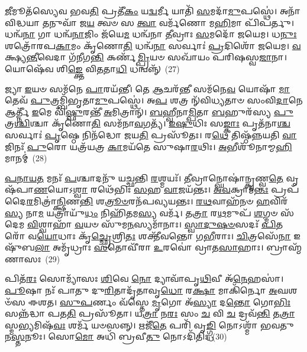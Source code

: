 {\anuvakamend[{\-\ul{𑌅}\-\-\ul{𑌗𑌾}\-𑍞 \ul{𑌸}\-\-\ul{𑌹}\-\-\ul{𑌸𑍍𑌰𑌾}\-\-\ul{𑌕𑍍𑌷} \ul{𑌦𑍇}\-\-\ul{𑌵𑌾𑌃} \ul{𑌸}\-𑌹𑌸𑍍𑌰᳴𑌧𑌾\-\ul{𑌰𑌾}\-𑌮𑌤𑍍𑌯𑍞᳴\-\ul{𑌹𑌾} 𑌅𑌨𑍁᳴𑌵𑌰𑍍𑌤𑍍𑌮𑌾\-\ul{𑌨𑌃} 𑌷𑍋𑌡᳴𑌶 𑌚}]}%

\-\ul{𑌜𑍀}\-𑌮𑍂𑌤᳴𑌸𑍍𑌯𑍇𑌵 𑌭𑌵\-\ul{𑌤𑌿} 𑌪𑍍𑌰𑌤𑍀᳴\-\ul{𑌕𑌂} 𑌯\-\ul{𑌦𑍍𑌵}\-𑌰𑍍𑌮𑍀 𑌯𑌾𑌤𑌿᳴ \ul{𑌸}\-𑌮𑌦𑌾᳴\-\ul{𑌮𑍁}\-𑌪𑌸𑍍𑌥𑍇॑। 𑌅𑌨𑌾᳴𑌵𑌿𑌦𑍍𑌧𑌯𑌾 \ul{𑌤}\-𑌨𑍁𑌵𑌾᳴ 𑌜\-\ul{𑌯} 𑌤𑍍𑌵𑍞 𑌸 \ul{𑌤𑍍𑌵𑌾} 𑌵𑌰𑍍𑌮᳴𑌣𑍋 𑌮\-\ul{𑌹𑌿}\-𑌮𑌾 𑌪𑌿᳴𑌪𑌰𑍍𑌤𑍁। 𑌧𑌨𑍍𑌵᳴\-\ul{𑌨𑌾} 𑌗𑌾 𑌧𑌨𑍍𑌵᳴\-\ul{𑌨𑌾}\-𑌜𑌿𑌂 𑌜᳴𑌯𑍇\-\ul{𑌮} 𑌧𑌨𑍍𑌵᳴𑌨𑌾 \ul{𑌤𑍀}\-𑌵𑍍𑌰𑌾𑌃 \ul{𑌸}\-𑌮𑌦𑍋᳴ 𑌜𑌯𑍇𑌮। 𑌧\-\ul{𑌨𑍁𑌃} 𑌶𑌤𑍍𑌰𑍋᳴𑌰𑌪\-\ul{𑌕𑌾}\-𑌮𑌂 𑌕𑍃᳴𑌣𑍋\-\ul{𑌤𑌿} 𑌧𑌨𑍍𑌵᳴\-\ul{𑌨𑌾} 𑌸𑌰𑍍𑌵𑌾𑌃॑ \ul{𑌪𑍍𑌰}\-𑌦𑌿𑌶𑍋᳴ 𑌜𑌯𑍇𑌮। \ul{𑌵}\-𑌕𑍍𑌷𑍍𑌯\-\ul{𑌨𑍍𑌤𑍀}\-𑌵𑍇𑌦𑌾 𑌗᳴𑌨𑍀𑌗\-\ul{𑌨𑍍𑌤𑌿} 𑌕𑌰𑍍𑌣᳴\-\ul{𑌮𑍍𑌪𑍍𑌰𑌿}\-𑌯𑍞 𑌸𑌖𑌾᳴𑌯𑌂 𑌪𑌰𑌿𑌷𑌸𑍍𑌵\-\ul{𑌜𑌾}\-𑌨𑌾। 𑌯𑍋𑌷𑍇᳴𑌵 𑌶𑌿\-\ul{𑌙𑍍𑌕𑍍𑌤𑍇} 𑌵𑌿\-\ul{𑌤}\-𑌤𑌾\-\ul{𑌧𑌿} 𑌧𑌨𑍍𑌵𑌨𑍍𑌨𑍍᳴~(27)

𑌜𑍍𑌯𑌾 \ul{𑌇}\-𑌯𑍞 𑌸𑌮᳴𑌨𑍇 \ul{𑌪𑌾}\-𑌰𑌯᳴𑌨𑍍𑌤𑍀। 𑌤𑍇 \ul{𑌆}\-𑌚𑌰᳴\-\ul{𑌨𑍍𑌤𑍀} 𑌸𑌮᳴𑌨𑍇\-\ul{𑌵} 𑌯𑍋𑌷𑌾᳴ \ul{𑌮𑌾}\-𑌤𑍇𑌵᳴ \ul{𑌪𑍁}\-𑌤𑍍𑌰𑌮𑍍𑌬𑌿᳴𑌭𑍃𑌤𑌾\-\ul{𑌮𑍁}\-𑌪𑌸𑍍𑌥𑍇॑। 𑌅\-\ul{𑌪} 𑌶𑌤𑍍𑌰 𑌨𑍍᳴𑌵𑌿𑌧𑍍𑌯𑌤𑌾𑍞 𑌸𑌂𑌵𑌿\-\ul{𑌦𑌾}\-𑌨𑍇 𑌆𑌰𑍍𑌤𑍍𑌨𑍀᳴ \ul{𑌇}\-𑌮𑍇 𑌵𑌿᳴\-\ul{𑌷𑍍𑌫𑍁}\-𑌰𑌨𑍍𑌤𑍀᳴ \ul{𑌅}\-𑌮𑌿𑌤𑍍𑌰𑌾𑌨𑍍᳴। \ul{𑌬}\-\-\ul{𑌹𑍍𑌵𑍀}\-𑌨𑌾\-\ul{𑌮𑍍𑌪𑌿}\-𑌤𑌾 \ul{𑌬}\-𑌹𑍁𑌰᳴𑌸𑍍𑌯 \ul{𑌪𑍁}\-𑌤𑍍𑌰\-\ul{𑌶𑍍𑌚𑌿}\-𑌶𑍍𑌚𑌾 𑌕𑍃᳴𑌣𑍋\-\ul{𑌤𑌿} 𑌸𑌮᳴𑌨𑌾\-\ul{𑌵}\-𑌗𑌤𑍍𑌯᳴। \ul{𑌇}\-\-\ul{𑌷𑍁}\-𑌧𑌿𑌃 𑌸\-\ul{𑌙𑍍𑌕𑌾𑌃} 𑌪𑍃𑌤᳴𑌨𑌾\-\ul{𑌶𑍍𑌚} 𑌸𑌰𑍍𑌵𑌾𑌃॑ \ul{𑌪𑍃}\-𑌷𑍍𑌠𑍇 𑌨𑌿𑌨᳴𑌦𑍍𑌧𑍋 𑌜𑌯\-\ul{𑌤𑌿} 𑌪𑍍𑌰𑌸𑍂᳴𑌤𑌃। 𑌰\-\ul{𑌥𑍇} 𑌤𑌿𑌷𑍍𑌠᳴𑌨𑍍𑌨𑌯𑌤𑌿 \ul{𑌵𑌾}\-𑌜𑌿𑌨𑌃᳴ \ul{𑌪𑍁}\-𑌰𑍋 𑌯𑌤𑍍𑌰᳴𑌯𑌤𑍍𑌰 \ul{𑌕𑌾}\-𑌮𑌯᳴𑌤𑍇 𑌸𑍁𑌷𑌾\-\ul{𑌰}\-𑌥𑌿𑌃। \ul{𑌅}\-𑌭𑍀𑌶𑍂᳴𑌨𑌾𑌮𑍍𑌮\-\ul{𑌹𑌿}\-𑌮𑌾𑌨𑌮𑍍॑~(28)

\-\ul{𑌪}\-\-\ul{𑌨𑌾}\-\-\ul{𑌯}\-\-\ul{𑌤} 𑌮𑌨𑌃᳴ \ul{𑌪}\-𑌶𑍍𑌚𑌾𑌦𑌨𑍁᳴ 𑌯𑌚𑍍𑌛𑌨𑍍𑌤𑌿 \ul{𑌰}\-𑌶𑍍𑌮𑌯𑌃᳴। \ul{𑌤𑍀}\-𑌵𑍍𑌰𑌾𑌨𑍍𑌘𑍋𑌷𑌾॑𑌨𑍍𑌕𑍃𑌣𑍍𑌵\-\ul{𑌤𑍇} 𑌵𑍃𑌷᳴𑌪𑌾\-\ul{𑌣}\-𑌯𑍋\-𑌽\-\ul{𑌶𑍍𑌵𑌾} 𑌰𑌥𑍇᳴𑌭𑌿𑌃 \ul{𑌸}\-𑌹 \ul{𑌵𑌾}\-𑌜𑌯᳴𑌨𑍍𑌤𑌃। \ul{𑌅}\-\-\ul{𑌵}\-𑌕𑍍𑌰𑌾𑌮᳴\-\ul{𑌨𑍍𑌤𑌃} 𑌪𑍍𑌰𑌪᳴𑌦𑍈\-\ul{𑌰}\-𑌮𑌿𑌤𑍍𑌰𑌾॑\-\ul{𑌨𑍍𑌕𑍍𑌷𑌿}\-𑌣\-\ul{𑌨𑍍𑌤𑌿} 𑌶\-\ul{𑌤𑍍𑌰𑍂}\-\-\ul{𑍞}\-𑌰𑌨᳴𑌪𑌵𑍍𑌯𑌯𑌨𑍍𑌤𑌃। \ul{𑌰}\-\-\ul{𑌥}\-𑌵𑌾𑌹᳴𑌨𑍞 \ul{𑌹}\-𑌵𑌿𑌰᳴\-\ul{𑌸𑍍𑌯} 𑌨𑌾\-\ul{𑌮} 𑌯𑌤𑍍𑌰𑌾𑌯𑍁᳴\-\ul{𑌧𑌂} 𑌨𑌿𑌹𑌿᳴𑌤𑌮\-\ul{𑌸𑍍𑌯} 𑌵𑌰𑍍𑌮᳴। 𑌤\-\ul{𑌤𑍍𑌰𑌾} 𑌰\-\ul{𑌥}\-𑌮𑍁𑌪᳴ \ul{𑌶}\-𑌗𑍍𑌮𑍞 𑌸᳴𑌦𑍇𑌮 \ul{𑌵𑌿}\-𑌶𑍍𑌵𑌾𑌹𑌾᳴ \ul{𑌵}\-𑌯𑍞 𑌸𑍁᳴𑌮\-\ul{𑌨}\-𑌸𑍍𑌯𑌮𑌾᳴𑌨𑌾𑌃। \ul{𑌸𑍍𑌵𑌾}\-\-\ul{𑌦𑍁}\-\-\ul{𑌷}\-\-\ul{𑍞}\-𑌸𑌦𑌃᳴ \ul{𑌪𑌿}\-𑌤𑌰𑍋᳴ 𑌵\-\ul{𑌯𑍋}\-𑌧𑌾𑌃 𑌕𑍃᳴\-\ul{𑌚𑍍𑌛𑍍𑌰𑍇}\-𑌶𑍍𑌰𑌿\-\ul{𑌤𑌃} 𑌶𑌕𑍍𑌤𑍀᳴𑌵𑌨𑍍𑌤𑍋 𑌗\-\ul{𑌭𑍀}\-𑌰𑌾𑌃। \ul{𑌚𑌿}\-𑌤𑍍𑌰𑌸𑍇᳴\-\ul{𑌨𑌾} 𑌇𑌷𑍁᳴𑌬\-\ul{𑌲𑌾} 𑌅𑌮𑍃᳴𑌧𑍍𑌰𑌾𑌃 \ul{𑌸}\-𑌤𑍋𑌵𑍀᳴𑌰𑌾 \ul{𑌉}\-𑌰𑌵𑍋॑ 𑌵𑍍𑌰𑌾𑌤\-\ul{𑌸𑌾}\-𑌹𑌾𑌃। 𑌬𑍍𑌰𑌾𑌹𑍍𑌮᳴𑌣𑌾𑌸𑌃~(29)

𑌪𑌿𑌤᳴\-\ul{𑌰𑌃} 𑌸𑍋𑌮𑍍𑌯𑌾᳴𑌸𑌃 \ul{𑌶𑌿}\-𑌵𑍇 \ul{𑌨𑍋} 𑌦𑍍𑌯𑌾𑌵𑌾᳴𑌪𑍃\-\ul{𑌥𑌿}\-𑌵𑍀 𑌅᳴\-\ul{𑌨𑍇}\-𑌹𑌸𑌾॑। \ul{𑌪𑍂}\-𑌷𑌾 𑌨𑌃᳴ 𑌪𑌾𑌤𑍁 𑌦𑍁\-\ul{𑌰𑌿}\-𑌤𑌾𑌦𑍃᳴𑌤𑌾𑌵𑍃\-\ul{𑌧𑍋} 𑌰\-\ul{𑌕𑍍𑌷𑌾} 𑌮𑌾𑌕𑌿᳴𑌰𑍍𑌨𑍋 \ul{𑌅}\-𑌘𑌶𑍞᳴𑌸 𑌈𑌶𑌤। \ul{𑌸𑍁}\-\-\ul{𑌪}\-𑌰𑍍𑌣𑌂 𑌵᳴𑌸𑍍𑌤𑍇 \ul{𑌮𑍃}\-𑌗𑍋 𑌅᳴\-\ul{𑌸𑍍𑌯𑌾} 𑌦\-\ul{𑌨𑍍𑌤𑍋} 𑌗𑍋\-\ul{𑌭𑌿𑌃} 𑌸𑌨𑍍𑌨᳴𑌦𑍍𑌧𑌾 𑌪𑌤\-\ul{𑌤𑌿} 𑌪𑍍𑌰𑌸𑍂᳴𑌤𑌾। 𑌯\-\ul{𑌤𑍍𑌰𑌾} 𑌨\-\ul{𑌰𑌃} 𑌸𑌂 \ul{𑌚} 𑌵𑌿 \ul{𑌚} 𑌦𑍍𑌰𑌵᳴\-\ul{𑌨𑍍𑌤𑌿} 𑌤\-\ul{𑌤𑍍𑌰𑌾}\-𑌸𑍍𑌮\-\ul{𑌭𑍍𑌯}\-𑌮𑌿𑌷᳴\-\ul{𑌵𑌃} 𑌶𑌰𑍍𑌮᳴ 𑌯𑍞𑌸𑌨𑍍𑌨𑍍। 𑌋𑌜𑍀᳴\-\ul{𑌤𑍇} 𑌪𑌰𑌿᳴ 𑌵𑍃\-\ul{𑌙𑍍𑌗𑍍𑌧𑌿} 𑌨𑍋\-𑌽𑌶𑍍𑌮𑌾᳴ 𑌭𑌵𑌤𑍁 𑌨\-\ul{𑌸𑍍𑌤}\-𑌨𑍂𑌃। 𑌸𑍋\-\ul{𑌮𑍋} 𑌅𑌧𑌿᳴ 𑌬𑍍𑌰𑌵𑍀\-\ul{𑌤𑍁} 𑌨𑍋\-𑌽𑌦𑌿᳴𑌤𑌿𑌃~(30)

